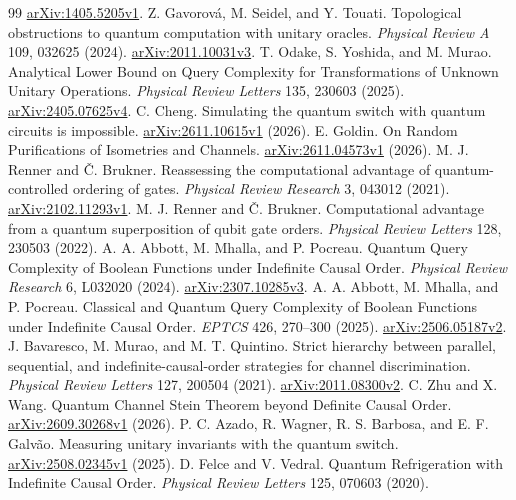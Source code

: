 \documentclass[11pt,letterpaper]{article}
\theoremstyle{definition}\newtheorem{definition}[theorem]{Definition}
\begin{document}
\begin{thebibliography}{99}
\href{https://arxiv.org/abs/1405.5205v1}{arXiv:1405.5205v1}.
 Z. Gavorov\'a, M. Seidel, and Y. Touati.
Topological obstructions to quantum computation with unitary oracles. \emph{Physical Review A} 109, 032625 (2024).
\href{https://arxiv.org/abs/2011.10031v3}{arXiv:2011.10031v3}.
 T. Odake, S. Yoshida, and M. Murao.
Analytical Lower Bound on Query Complexity for Transformations of Unknown Unitary Operations. \emph{Physical Review Letters} 135, 230603 (2025).
\href{https://arxiv.org/abs/2405.07625v4}{arXiv:2405.07625v4}.
 C. Cheng.
Simulating the quantum switch with quantum circuits is impossible.
\href{https://arxiv.org/abs/2611.10615v1}{arXiv:2611.10615v1} (2026).
 E. Goldin.
On Random Purifications of Isometries and Channels.
\href{https://arxiv.org/abs/2611.04573v1}{arXiv:2611.04573v1} (2026).
 M. J. Renner and \v C. Brukner.
Reassessing the computational advantage of quantum-controlled ordering of gates.
\emph{Physical Review Research} 3, 043012 (2021).
\href{https://arxiv.org/abs/2102.11293v1}{arXiv:2102.11293v1}.
 M. J. Renner and \v C. Brukner.
Computational advantage from a quantum superposition of qubit gate orders. \emph{Physical Review Letters} 128, 230503 (2022).
 A. A. Abbott, M. Mhalla, and P. Pocreau.
Quantum Query Complexity of Boolean Functions under Indefinite Causal Order.
\emph{Physical Review Research} 6, L032020 (2024).
\href{https://arxiv.org/abs/2307.10285v3}{arXiv:2307.10285v3}.
 A. A. Abbott, M. Mhalla, and P. Pocreau.
Classical and Quantum Query Complexity of Boolean Functions under Indefinite
Causal Order. \emph{EPTCS} 426, 270--300 (2025).
\href{https://arxiv.org/abs/2506.05187v2}{arXiv:2506.05187v2}.
 J. Bavaresco, M. Murao, and M. T. Quintino.
Strict hierarchy between parallel, sequential, and indefinite-causal-order strategies for channel discrimination. \emph{Physical Review Letters} 127, 200504 (2021).
\href{https://arxiv.org/abs/2011.08300v2}{arXiv:2011.08300v2}.
 C. Zhu and X. Wang.
Quantum Channel Stein Theorem beyond Definite Causal Order.
\href{https://arxiv.org/abs/2609.30268v1}{arXiv:2609.30268v1} (2026).
 P. C. Azado, R. Wagner, R. S. Barbosa, and E. F. Galv\~ao.
Measuring unitary invariants with the quantum switch.
\href{https://arxiv.org/abs/2508.02345v1}{arXiv:2508.02345v1} (2025).
 D. Felce and V. Vedral.
Quantum Refrigeration with Indefinite Causal Order. \emph{Physical Review Letters} 125, 070603 (2020).

\end{thebibliography}
\end{document}

